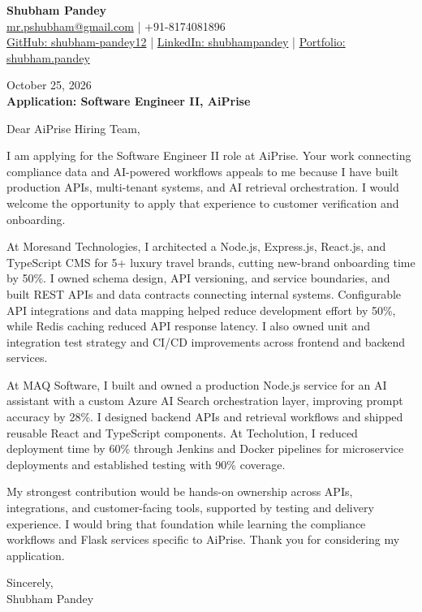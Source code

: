 \documentclass[a4paper,10pt]{article}
\begin{document}
\begin{center}
{\LARGE\textbf{Shubham Pandey}}\\[3pt]
\href{mailto:mr.pshubham@gmail.com}{mr.pshubham@gmail.com} | +91-8174081896\\[2pt]
\href{https://github.com/shubham-pandey12}{GitHub: shubham-pandey12} | \href{https://www.linkedin.com/in/shubham-pandey-a74716199/}{LinkedIn: shubhampandey} | \href{https://shubham-portfolio-mocha.vercel.app/}{Portfolio: shubham.pandey}
\end{center}
October 25, 2026\\[6pt]
\textbf{Application: Software Engineer II, AiPrise}

\vspace{12pt}
Dear AiPrise Hiring Team,

I am applying for the Software Engineer II role at AiPrise. Your work connecting compliance data and AI-powered workflows appeals to me because I have built production APIs, multi-tenant systems, and AI retrieval orchestration. I would welcome the opportunity to apply that experience to customer verification and onboarding.

\vspace{6pt}
At Moresand Technologies, I architected a Node.js, Express.js, React.js, and TypeScript CMS for 5+ luxury travel brands, cutting new-brand onboarding time by 50\%. I owned schema design, API versioning, and service boundaries, and built REST APIs and data contracts connecting internal systems. Configurable API integrations and data mapping helped reduce development effort by 50\%, while Redis caching reduced API response latency. I also owned unit and integration test strategy and CI/CD improvements across frontend and backend services.

\vspace{6pt}
At MAQ Software, I built and owned a production Node.js service for an AI assistant with a custom Azure AI Search orchestration layer, improving prompt accuracy by 28\%. I designed backend APIs and retrieval workflows and shipped reusable React and TypeScript components. At Techolution, I reduced deployment time by 60\% through Jenkins and Docker pipelines for microservice deployments and established testing with 90\% coverage.

\vspace{6pt}
My strongest contribution would be hands-on ownership across APIs, integrations, and customer-facing tools, supported by testing and delivery experience. I would bring that foundation while learning the compliance workflows and Flask services specific to AiPrise. Thank you for considering my application.

\vspace{12pt}
Sincerely,\\[4pt]
Shubham Pandey
\end{document}
